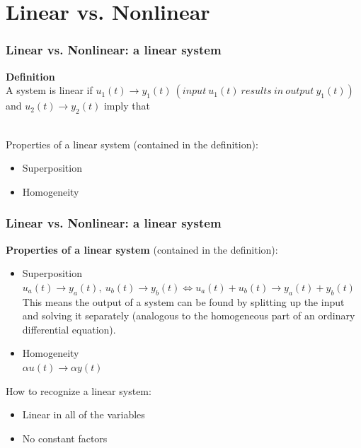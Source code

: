 \documentclass{beamer}
\begin{document}
\section{Linear vs. Nonlinear}

\begin{frame}
\frametitle{Linear vs. Nonlinear: a linear system}
\vspace{-6ex}
\textbf{Definition}\\
\medskip
A system is linear if $u_{1}(t) \rightarrow y_{1}(t)\> (input\> u_{1}(t) \>results\> in\>output \>y_{1}(t))$ and $u_{2}(t) \rightarrow y_{2}(t)$ imply that \\
\\
\begin{flushleft}
Properties of a linear system (contained in the definition):
\end{flushleft}
\vspace{-2ex}
\begin{itemize}
\item Superposition
\item Homogeneity
\end{itemize}
\end{frame}


\begin{frame}
\frametitle{Linear vs. Nonlinear: a linear system}
\textbf{Properties of a linear system} (contained in the definition):
\begin{itemize}
\item Superposition\\
\smallskip
$u_{a}(t) \rightarrow y_{a}(t),\> u_{b}(t) \rightarrow y_{b}(t) \Leftrightarrow u_{a}(t) + u_{b}(t) \rightarrow y_{a}(t) + y_{b}(t)$\\
\medskip
This means the output of a system can be found by splitting up the input and solving it separately (analogous to the homogeneous part of an ordinary differential equation).
\item Homogeneity\\
\smallskip
$\alpha u(t) \rightarrow \alpha y(t)$\\
\end{itemize}
\bigskip
How to recognize a linear system:
\begin{itemize}
\item Linear in all of the variables
\item No constant factors
\end{itemize}
\end{frame}
\end{document}
